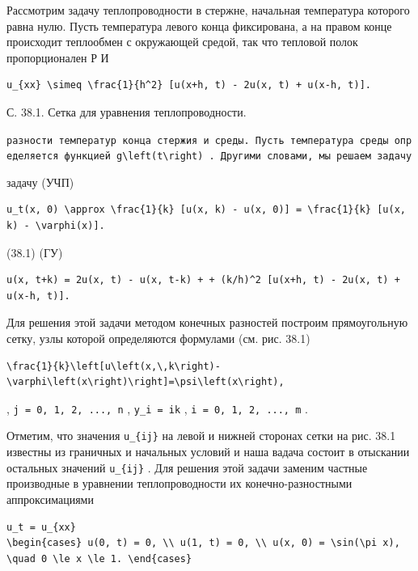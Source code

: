 \documentclass[
  ukrainian,
]{article}
\begin{document}
Рассмотрим задачу теплопроводности в стержне, начальная температура
которого равна нулю. Пусть температура левого конца фиксирована, а на
правом конце происходит теплообмен с окружающей средой, так что тепловой
полок пропорционален Р И

\begin{verbatim}
u_{xx} \simeq \frac{1}{h^2} [u(x+h, t) - 2u(x, t) + u(x-h, t)].
\end{verbatim}

С. 38.1. Сетка для уравнения теплопроводности.

\texttt{разности\ температур\ конца\ стержия\ и\ среды.\ Пусть\ температура\ среды\ определяется\ функцией\ \textquotesingle{}g\textbackslash{}left(t\textbackslash{}right)\textquotesingle{}\ .\ Другими\ словами,\ мы\ решаем\ задачу}

задачу (УЧП)

\begin{verbatim}
u_t(x, 0) \approx \frac{1}{k} [u(x, k) - u(x, 0)] = \frac{1}{k} [u(x, k) - \varphi(x)].
\end{verbatim}

(38.1) (ГУ)

\begin{verbatim}
u(x, t+k) = 2u(x, t) - u(x, t-k) + + (k/h)^2 [u(x+h, t) - 2u(x, t) + u(x-h, t)].
\end{verbatim}

Для решения этой задачи методом конечных разностей построим
прямоугольную сетку, узлы которой определяются формулами (см. рис. 38.1)

\begin{verbatim}
\frac{1}{k}\left[u\left(x,\,k\right)-\varphi\left(x\right)\right]=\psi\left(x\right),
\end{verbatim}

, \texttt{j\ =\ 0,\ 1,\ 2,\ ...,\ n} , \texttt{y\_i\ =\ ik} ,
\texttt{i\ =\ 0,\ 1,\ 2,\ ...,\ m} .

Отметим, что значения \texttt{u\_\{ij\}} на левой и нижней сторонах
сетки на рис. 38.1 известны из граничных и начальных условий и наша
вадача состоит в отыскании остальных значений \texttt{u\_\{ij\}} . Для
решения этой задачи заменим частные производные в уравнении
теплопроводности их конечно-разностными аппроксимациями

\begin{verbatim}
u_t = u_{xx}
\begin{cases} u(0, t) = 0, \\ u(1, t) = 0, \\ u(x, 0) = \sin(\pi x), \quad 0 \le x \le 1. \end{cases}
\end{verbatim}
\end{document}
